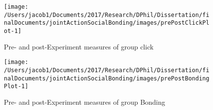 \documentclass[english]{article}\usepackage[]{graphicx}\usepackage[]{color}
\makeatletter
\def\maxwidth{ %
  \ifdim\Gin@nat@width>\linewidth
    \linewidth
  \else
    \Gin@nat@width
  \fi
}
\newenvironment{kframe}{%
 \def\at@end@of@kframe{}%
 \ifinner\ifhmode%
  \def\at@end@of@kframe{\end{minipage}}%
  \begin{minipage}{\columnwidth}%
 \fi\fi%
 \def\FrameCommand##1{\hskip\@totalleftmargin \hskip-\fboxsep
 \colorbox{shadecolor}{##1}\hskip-\fboxsep
     \hskip-\linewidth \hskip-\@totalleftmargin \hskip\columnwidth}%
 \MakeFramed {\advance\hsize-\width
   \@totalleftmargin\z@ \linewidth\hsize
   \@setminipage}}%
 {\par\unskip\endMakeFramed%
 \at@end@of@kframe}
\newenvironment{knitrout}{}{} %
\makeatother
\begin{document}
\begin{knitrout}
\color{fgcolor}\begin{kframe}


{\ttfamily\noindent\itshape\color{messagecolor}{\#\# Saving 3.5 x 3.5 in image}}

{\ttfamily\noindent\color{warningcolor}{\#\# Warning: Removed 53 rows containing non-finite values (stat\_boxplot).}}

{\ttfamily\noindent\color{warningcolor}{\#\# Warning: Removed 53 rows containing non-finite values (stat\_boxplot).}}\end{kframe}\begin{figure}

{\centering \texttt{[image: /Users/jacob1/Documents/2017/Research/DPhil/Dissertation/finalDocuments/jointActionSocialBonding/images/prePostClickPlot-1]} 

}

\caption[Pre- and post-Experiment measures of group click]{Pre- and post-Experiment measures of group click}\label{fig:prePostClickPlot}
\end{figure}


\end{knitrout}





\begin{knitrout}
\color{fgcolor}\begin{kframe}


{\ttfamily\noindent\itshape\color{messagecolor}{\#\# Saving 3.5 x 3.5 in image}}

{\ttfamily\noindent\color{warningcolor}{\#\# Warning: Removed 53 rows containing non-finite values (stat\_boxplot).}}

{\ttfamily\noindent\color{warningcolor}{\#\# Warning: Removed 53 rows containing non-finite values (stat\_boxplot).}}\end{kframe}\begin{figure}

{\centering \texttt{[image: /Users/jacob1/Documents/2017/Research/DPhil/Dissertation/finalDocuments/jointActionSocialBonding/images/prePostBondingPlot-1]} 

}

\caption[Pre- and post-Experiment measures of group Bonding]{Pre- and post-Experiment measures of group Bonding}\label{fig:prePostBondingPlot}
\end{figure}


\end{knitrout}
\end{document}

